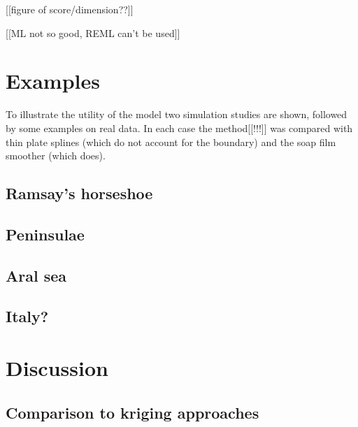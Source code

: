 \documentclass[useAMS,referee, usegraphicx]{biom}
\begin{document}
[[figure of score/dimension??]]

[[ML not so good, REML can't be used]]

\section{Examples}
\label{examples}

To illustrate the utility of the model two simulation studies are shown, followed by some examples on real data. In each case the method[[!!!]] was compared with thin plate splines (which do not account for the boundary) and the soap film smoother (which does).

\subsection{Ramsay's horseshoe}

\subsection{Peninsulae}

\subsection{Aral sea}

\subsection{Italy?}

\section{Discussion}
\label{conclusion}





\subsection{Comparison to kriging approaches}
\end{document}
